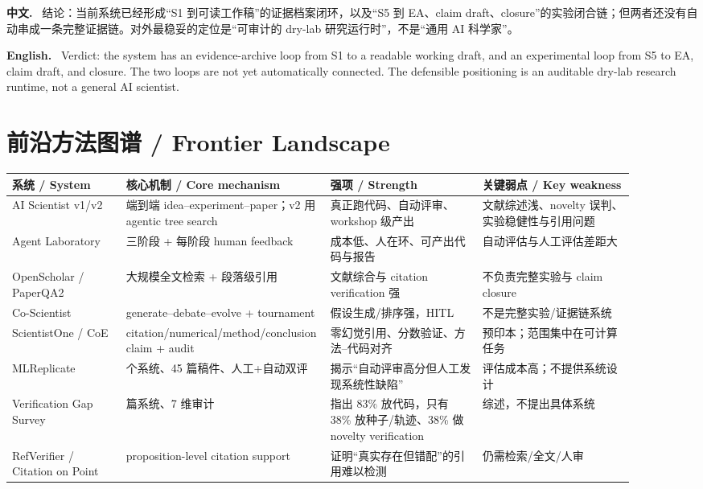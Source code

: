 \documentclass[UTF8,11pt]{ctexart}
\newcommand{\zh}{\par\noindent\textbf{中文.}\ }
\newcommand{\en}{\par\noindent\textbf{English.}\ }
\begin{document}
\zh
结论：当前系统已经形成“S1 到可读工作稿”的证据档案闭环，以及“S5 到 EA、claim draft、closure”的实验闭合链；但两者还没有自动串成一条完整证据链。对外最稳妥的定位是“可审计的 dry-lab 研究运行时”，不是“通用 AI 科学家”。
\en
Verdict: the system has an evidence-archive loop from S1 to a readable working draft, and an experimental loop from S5 to EA, claim draft, and closure. The two loops are not yet automatically connected. The defensible positioning is an auditable dry-lab research runtime, not a general AI scientist.

\section{前沿方法图谱 / Frontier Landscape}

\begin{longtable}{>{\raggedright\arraybackslash}p{0.18\linewidth} >{\raggedright\arraybackslash}p{0.24\linewidth} >{\raggedright\arraybackslash}p{0.24\linewidth} >{\raggedright\arraybackslash}p{0.24\linewidth}}
\toprule
系统 / System & 核心机制 / Core mechanism & 强项 / Strength & 关键弱点 / Key weakness\\
\midrule
\endhead
AI Scientist v1/v2 & 端到端 idea--experiment--paper；v2 用 agentic tree search & 真正跑代码、自动评审、workshop 级产出 & 文献综述浅、novelty 误判、实验稳健性与引用问题\\
Agent Laboratory & 三阶段 + 每阶段 human feedback & 成本低、人在环、可产出代码与报告 & 自动评估与人工评估差距大\\
OpenScholar / PaperQA2 & 大规模全文检索 + 段落级引用 & 文献综合与 citation verification 强 & 不负责完整实验与 claim closure\\
Co-Scientist & generate--debate--evolve + tournament & 假设生成/排序强，HITL & 不是完整实验/证据链系统\\
ScientistOne / CoE & citation/\allowbreak numerical/\allowbreak method/\allowbreak conclusion claim + audit & 零幻觉引用、分数验证、方法--代码对齐 & 预印本；范围集中在可计算任务\\
MLReplicate & 6 个系统、45 篇稿件、人工+自动双评 & 揭示“自动评审高分但人工发现系统性缺陷” & 评估成本高；不提供系统设计\\
Verification Gap Survey & 35 篇系统、7 维审计 & 指出 83\% 放代码，只有 38\% 放种子/轨迹、38\% 做 novelty verification & 综述，不提出具体系统\\
RefVerifier / Citation on Point & proposition-level citation support & 证明“真实存在但错配”的引用难以检测 & 仍需检索/全文/人审\\
\bottomrule
\end{longtable}
\end{document}

